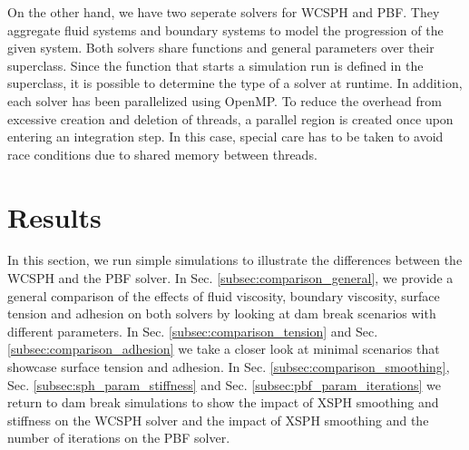 \documentclass[11pt, letterpaper, twocolumn]{article}
\begin{document}
On the other hand, we have two seperate solvers for WCSPH and PBF. They aggregate fluid systems and boundary systems to model the progression of the given system. Both solvers share functions and general parameters over their superclass. Since the function that starts a simulation run is defined in the superclass, it is possible to determine the type of a solver at runtime.
In addition, each solver has been parallelized using OpenMP. To reduce the overhead from excessive creation and deletion of threads, a parallel region is created once upon entering an integration step. In this case, special care has to be taken to avoid race conditions due to shared memory between threads.

\section{Results}
\label{sec:results}
In this section, we run simple simulations to illustrate the differences between the WCSPH and the PBF solver. In Sec. \ref{subsec:comparison_general}, we provide a general comparison of the effects of fluid viscosity, boundary viscosity, surface tension and adhesion on both solvers by looking at dam break scenarios with different parameters. In Sec. \ref{subsec:comparison_tension} and Sec. \ref{subsec:comparison_adhesion} we take a closer look at minimal scenarios that showcase surface tension and 
adhesion. In Sec. \ref{subsec:comparison_smoothing}, Sec. \ref{subsec:sph_param_stiffness} and Sec. \ref{subsec:pbf_param_iterations} we return to dam break simulations to show the impact of XSPH smoothing and stiffness on the WCSPH solver and the impact of XSPH smoothing and the number of iterations on the PBF solver.  

\end{document}
